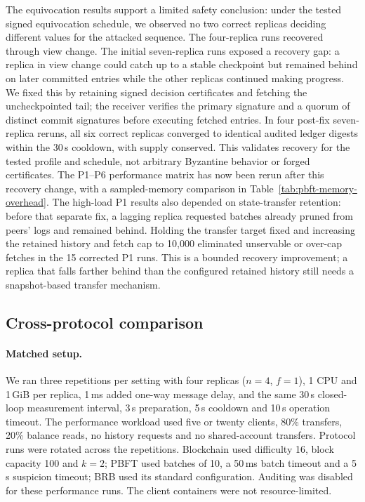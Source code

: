 \documentclass[sigconf,a4paper]{acmart}
\begin{document}
    The equivocation results support a limited safety conclusion: under the
    tested signed equivocation schedule, we observed no two correct replicas
    deciding different values for the attacked sequence. The four-replica runs
    recovered through view change. The initial seven-replica runs exposed a
    recovery gap: a replica in view change could catch up to a stable checkpoint
    but remained behind on later committed entries while the other replicas
    continued making progress. We fixed this by retaining signed decision
    certificates and fetching the uncheckpointed tail; the receiver verifies
    the primary signature and a quorum of distinct commit signatures before
    executing fetched entries. In four post-fix seven-replica reruns, all six
    correct replicas converged to identical audited ledger digests within the
    30\,s cooldown, with supply conserved. This validates recovery for the
    tested profile and schedule, not arbitrary Byzantine behavior or forged
    certificates. The P1--P6 performance matrix has now been rerun after this
    recovery change, with a sampled-memory comparison in
    Table~\ref{tab:pbft-memory-overhead}. The high-load P1 results also
    depended on state-transfer retention: before that separate fix, a lagging replica
    requested batches already pruned from peers' logs and remained behind.
    Holding the transfer target fixed and increasing the retained history and
    fetch cap to 10,000 eliminated unservable or over-cap fetches in the 15
    corrected P1 runs. This is a bounded recovery improvement; a replica that
    falls farther behind than the configured retained history still needs a
    snapshot-based transfer mechanism.

    \subsection{Cross-protocol comparison}
    \label{subsec:eval-performance-comparison}
    \paragraph{Matched setup.}
    We ran three repetitions per setting with four replicas ($n=4$, $f=1$),
    1 CPU and 1\,GiB per replica, 1\,ms added one-way message delay, and the
    same 30\,s closed-loop measurement interval, 3\,s preparation, 5\,s
    cooldown and 10\,s operation timeout. The performance workload used five
    or twenty clients, 80\% transfers, 20\% balance reads, no history requests
    and no shared-account transfers. Protocol runs were rotated across the
    repetitions. Blockchain used difficulty 16, block capacity 100 and $k=2$;
    PBFT used batches of 10, a 50\,ms batch timeout and a 5\,s suspicion
    timeout; BRB used its standard configuration. Auditing was disabled for
    these performance runs. The client containers were not resource-limited.
\end{document}
